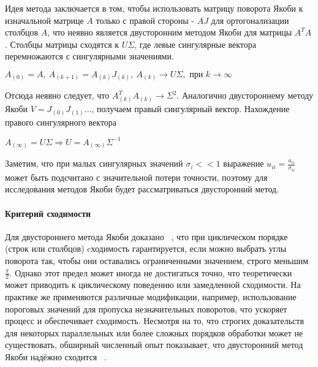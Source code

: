 \documentclass[12pt, a4paper]{report}
\theoremstyle{note}
\begin{document}
Идея метода заключается в том, чтобы использовать матрицу поворота Якоби к изначальной матрице $A$ только с правой стороны - $AJ$ для ортогонализации столбцов $A$, что неявно является двусторонним методом Якоби для матрицы $A^TA$.
Столбцы матрицы сходятся к $U\Sigma$, где левые сингулярные вектора перемножаются с сингулярными значениями.
\begin{center}
     $A_{(0)}=A,\ A_{(k+1)} = A_{(k)}J_{(k)},\ A_{(k)} \longrightarrow U\Sigma, \text{ при } k\to\infty$
 \end{center}
 Отсюда неявно следует, что $A^T_{(k)}A_{(k)} \to \Sigma^2$. Аналогично двустороннему методу Якоби $V = J_{(0)}J_{(1)}...$, получаем правый сингулярный вектор. Нахождение правого сингулярного вектора 
 \begin{center}
     $A_{(\infty)} = U\Sigma \Rightarrow U = A_{(\infty)}\Sigma^{-1}$
 \end{center}
 Заметим, что при малых сингулярных значений $\sigma_i<<1$ выражение $u_{ii} = \frac{a_{ii}}{\sigma_{ii}}$ может быть подсчитано с значительной потери точности, поэтому для исследования методов Якоби будет рассматриваться двусторонний метод.

\paragraph{Критерий сходимости}
Для двустороннего метода Якоби доказано ~\cite{Forsythe1960}, что при циклическом порядке (строк или столбцов) cходимость гарантируется, если можно выбрать углы поворота так, чтобы они оставались ограниченными значением, строго меньшим $\frac{\pi}{2}$. Однако этот предел может иногда не достигаться точно, что теоретически может приводить к циклическому поведению или замедленной сходимости. На практике же применяются различные модификации, например, использование пороговых значений для пропуска незначительных поворотов, что ускоряет процесс и обеспечивает сходимость. Несмотря на то, что строгих доказательств для некоторых параллельных или более сложных порядков обработки может не существовать, обширный численный опыт показывает, что двусторонний метод Якоби надёжно сходится ~\cite{Dongarra2018}.
\end{document}
